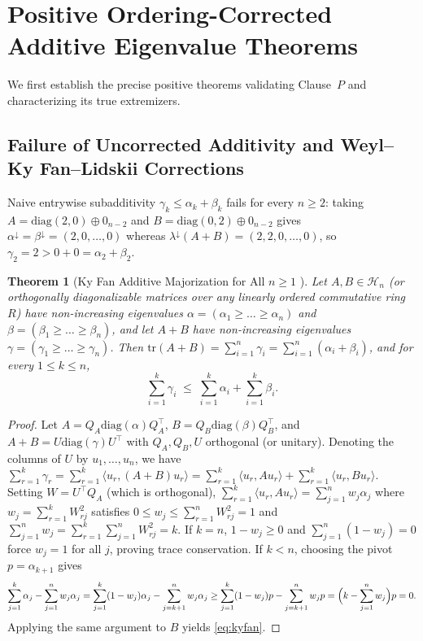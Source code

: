 \documentclass[11pt,a4paper]{article}
\theoremstyle{plain}
\newtheorem{theorem}{Theorem}[section]
\theoremstyle{definition}
\newcommand{\tr}{\mathrm{tr}}
\newcommand{\diag}{\mathrm{diag}}
\newcommand{\Herm}{\mathcal{H}}
\begin{document}
\section{Positive Ordering-Corrected Additive Eigenvalue Theorems}

We first establish the precise positive theorems validating Clause~$P$ and characterizing its true extremizers.

\subsection{Failure of Uncorrected Additivity and Weyl--Ky Fan--Lidskii Corrections}
Naive entrywise subadditivity $\gamma_k \le \alpha_k + \beta_k$ fails for every $n \ge 2$: taking $A = \diag(2, 0) \oplus 0_{n-2}$ and $B = \diag(0, 2) \oplus 0_{n-2}$ gives $\alpha^\downarrow = \beta^\downarrow = (2, 0, \dots, 0)$ whereas $\lambda^\downarrow(A + B) = (2, 2, 0, \dots, 0)$, so $\gamma_2 = 2 > 0 + 0 = \alpha_2 + \beta_2$.

\begin{theorem}[Ky Fan Additive Majorization for All $n \ge 1$ \cite{KyFan1949}]\label{thm:kyfan}
Let $A, B \in \Herm_n$ (or orthogonally diagonalizable matrices over any linearly ordered commutative ring $R$) have non-increasing eigenvalues $\alpha = (\alpha_1 \ge \dots \ge \alpha_n)$ and $\beta = (\beta_1 \ge \dots \ge \beta_n)$, and let $A + B$ have non-increasing eigenvalues $\gamma = (\gamma_1 \ge \dots \ge \gamma_n)$. Then $\tr(A + B) = \sum_{i=1}^n \gamma_i = \sum_{i=1}^n (\alpha_i + \beta_i)$, and for every $1 \le k \le n$,
\begin{equation}\label{eq:kyfan}
  \sum_{i=1}^k \gamma_i \;\le\; \sum_{i=1}^k \alpha_i + \sum_{i=1}^k \beta_i.
\end{equation}
\end{theorem}

\begin{proof}
Let $A = Q_A \diag(\alpha) Q_A^\top$, $B = Q_B \diag(\beta) Q_B^\top$, and $A + B = U \diag(\gamma) U^\top$ with $Q_A, Q_B, U$ orthogonal (or unitary). Denoting the columns of $U$ by $u_1, \dots, u_n$, we have $\sum_{r=1}^k \gamma_r = \sum_{r=1}^k \langle u_r, (A + B) u_r \rangle = \sum_{r=1}^k \langle u_r, A u_r \rangle + \sum_{r=1}^k \langle u_r, B u_r \rangle$. Setting $W = U^\top Q_A$ (which is orthogonal), $\sum_{r=1}^k \langle u_r, A u_r \rangle = \sum_{j=1}^n w_j \alpha_j$ where $w_j = \sum_{r=1}^k W_{rj}^2$ satisfies $0 \le w_j \le \sum_{r=1}^n W_{rj}^2 = 1$ and $\sum_{j=1}^n w_j = \sum_{r=1}^k \sum_{j=1}^n W_{rj}^2 = k$. If $k = n$, $1 - w_j \ge 0$ and $\sum_{j=1}^n (1 - w_j) = 0$ force $w_j = 1$ for all $j$, proving trace conservation. If $k < n$, choosing the pivot $p = \alpha_{k+1}$ gives
\[
  \sum_{j=1}^k \alpha_j - \sum_{j=1}^n w_j \alpha_j
  = \sum_{j=1}^k (1 - w_j)\alpha_j - \sum_{j=k+1}^n w_j \alpha_j
  \ge \sum_{j=1}^k (1 - w_j) p - \sum_{j=k+1}^n w_j p
  = \Bigl(k - \sum_{j=1}^n w_j\Bigr) p = 0.
\]
Applying the same argument to $B$ yields \eqref{eq:kyfan}.
\end{proof}
\end{document}
